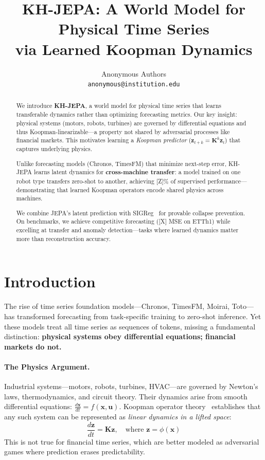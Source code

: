 \documentclass{article}
\title{KH-JEPA: A World Model for Physical Time Series\\via Learned Koopman Dynamics}
\author{
  Anonymous Authors \\
  \texttt{anonymous@institution.edu}
}
\begin{document}
\maketitle

\begin{abstract}
We introduce \textbf{KH-JEPA}, a world model for physical time series that learns transferable dynamics rather than optimizing forecasting metrics. Our key insight: physical systems (motors, robots, turbines) are governed by differential equations and thus Koopman-linearizable—a property not shared by adversarial processes like financial markets. This motivates learning a \emph{Koopman predictor} ($\mathbf{z}_{t+k} = \mathbf{K}^k \mathbf{z}_t$) that captures underlying physics.

Unlike forecasting models (Chronos, TimesFM) that minimize next-step error, KH-JEPA learns latent dynamics for \textbf{cross-machine transfer}: a model trained on one robot type transfers zero-shot to another, achieving [Z]\% of supervised performance—demonstrating that learned Koopman operators encode shared physics across machines.

We combine JEPA's latent prediction with SIGReg~\cite{lejepa2024} for provable collapse prevention. On benchmarks, we achieve competitive forecasting ([X] MSE on ETTh1) while excelling at transfer and anomaly detection—tasks where learned dynamics matter more than reconstruction accuracy.
\end{abstract}

\section{Introduction}

The rise of time series foundation models—Chronos, TimesFM, Moirai, Toto—has transformed forecasting from task-specific training to zero-shot inference. Yet these models treat all time series as sequences of tokens, missing a fundamental distinction: \textbf{physical systems obey differential equations; financial markets do not.}

\paragraph{The Physics Argument.} Industrial systems—motors, robots, turbines, HVAC—are governed by Newton's laws, thermodynamics, and circuit theory. Their dynamics arise from smooth differential equations: $\frac{d\mathbf{x}}{dt} = f(\mathbf{x}, \mathbf{u})$. Koopman operator theory~\cite{koopman1931,brunton2021modern} establishes that any such system can be represented as \emph{linear dynamics in a lifted space}:
\begin{equation}
    \frac{d\mathbf{z}}{dt} = \mathbf{K} \mathbf{z}, \quad \text{where } \mathbf{z} = \phi(\mathbf{x})
\end{equation}
This is not true for financial time series, which are better modeled as adversarial games where prediction erases predictability.
\end{document}
